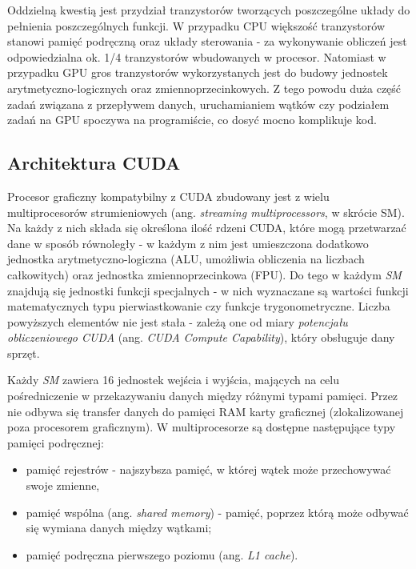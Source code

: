 \documentclass[12pt]{article}
\begin{document}
Oddzielną kwestią jest przydział tranzystorów tworzących poszczególne układy do pełnienia poszczególnych funkcji. W przypadku CPU większość tranzystorów stanowi pamięć podręczną oraz układy sterowania - za wykonywanie obliczeń jest odpowiedzialna ok. 1/4 tranzystorów wbudowanych w procesor. Natomiast w przypadku GPU gros tranzystorów wykorzystanych jest do budowy jednostek arytmetyczno-logicznych oraz zmiennoprzecinkowych. Z tego powodu duża część zadań związana z przepływem danych, uruchamianiem wątków czy podziałem zadań na GPU spoczywa na programiście, co dosyć mocno komplikuje kod.

\subsection{Architektura CUDA}

Procesor graficzny kompatybilny z CUDA zbudowany jest z wielu multiprocesorów strumieniowych (ang. \textit{streaming multiprocessors}, w skrócie SM). Na każdy z nich składa się określona ilość rdzeni CUDA, które mogą przetwarzać dane w sposób równoległy - w każdym z nim jest umieszczona dodatkowo jednostka arytmetyczno-logiczna (ALU, umożliwia obliczenia na liczbach całkowitych) oraz jednostka zmiennoprzecinkowa (FPU). Do tego w każdym \textit{SM} znajdują się jednostki funkcji specjalnych - w nich wyznaczane są wartości funkcji matematycznych typu pierwiastkowanie czy funkcje trygonometryczne. Liczba powyższych elementów nie jest stała - zależą one od miary \textit{potencjału obliczeniowego CUDA} (ang. \textit{CUDA Compute Capability}), który obsługuje dany sprzęt.

Każdy \textit{SM} zawiera 16 jednostek wejścia i wyjścia, mających na celu pośredniczenie w przekazywaniu danych między różnymi typami pamięci. Przez nie odbywa się transfer danych do pamięci RAM karty graficznej (zlokalizowanej poza procesorem graficznym). W multiprocesorze są dostępne następujące typy pamięci podręcznej:

\begin{itemize}
\item pamięć rejestrów - najszybsza pamięć, w której wątek może przechowywać swoje zmienne,
\item pamięć wspólna (ang. \textit{shared memory}) - pamięć, poprzez którą może odbywać się wymiana danych między wątkami;
\item pamięć podręczna pierwszego poziomu (ang. \textit{L1 cache}).
\end{itemize}
\end{document}
